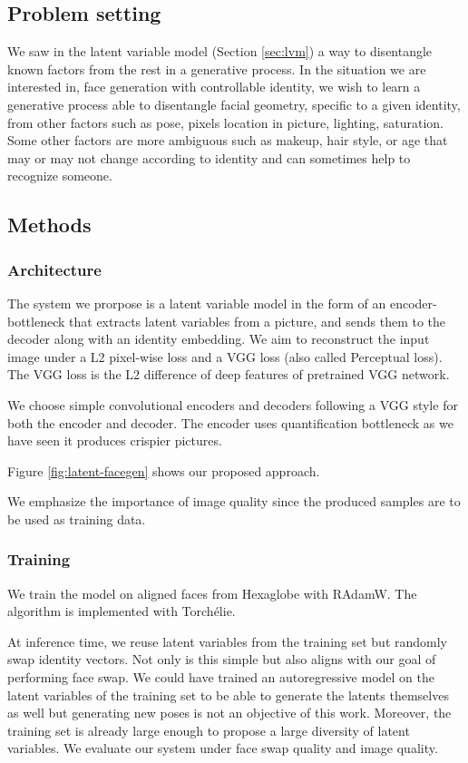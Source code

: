 \subsection{Problem setting}

We saw in the latent variable model (Section \ref{sec:lvm}) a way to disentangle known factors from the rest in a generative process. In the situation we are interested in, face generation with controllable identity, we wish to learn a generative process able to disentangle facial geometry, specific to a given identity, from other factors such as pose, pixels location in picture, lighting, saturation. Some other factors are more ambiguous such as makeup, hair style, or age that may or may not change according to identity and can sometimes help to recognize someone.


\subsection{Methods}

\subsubsection{Architecture}

The system we prorpose is a latent variable model in the form of an encoder-bottleneck that extracts latent variables from a picture, and sends them to the decoder along with an identity embedding. We aim to reconstruct the input image under a L2 pixel-wise loss and a VGG loss (also called Perceptual loss). The VGG loss is the L2 difference of deep features of pretrained VGG network.

We choose simple convolutional encoders and decoders following a VGG style for both the encoder and decoder. The encoder uses quantification bottleneck as we have seen it produces crispier pictures.

Figure \ref{fig:latent-facegen} shows our proposed approach.

We emphasize the importance of image quality since the produced samples are to be used as training data.

\subsubsection{Training}

We train the model on aligned faces from Hexaglobe with RAdamW. The algorithm is implemented with Torchélie.

At inference time, we reuse latent variables from the training set but randomly swap identity vectors. Not only is this simple but also aligns with our goal of performing face swap. We could have trained an autoregressive model on the latent variables of the training set to be able to generate the latents themselves as well but generating new poses is not an objective of this work. Moreover, the training set is already large enough to propose a large diversity of latent variables. We evaluate our system under face swap quality and image quality.

